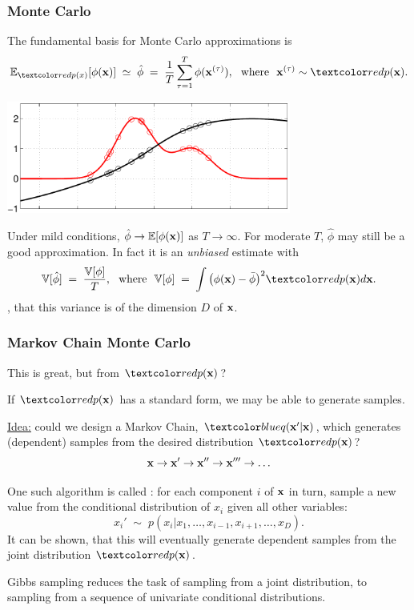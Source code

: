 \begin{frame}
\frametitle{Monte Carlo}

The fundamental basis for Monte Carlo approximations is
\[
\E_{\Red{p(x)}}[\phi(\bfx)]\;\simeq\;\hat\phi\;=\;\frac{1}{T}\sum_{\tau=1}^T\phi(\bfx^{(\tau)}),
\text{\ \ where\ \ }\bfx^{(\tau)}\sim \Red{p(\bfx)}.
\]

\centerline{\includegraphics[width=0.7\textwidth]{mc4}}

Under mild conditions, $\hat\phi\rightarrow\mathbb{E}[\phi(\mathbf x)]$ as
$T\rightarrow\infty$. For moderate $T$, $\hat\phi$ may still be a good
approximation. In fact it is an \emph{unbiased} estimate with
\[
\V[\hat\phi]\;=\;\frac{\V[\phi]}{T}, \text{\ \ where\ \ }
\V[\phi]\;=\;\int \big(\phi(\bfx)-\bar\phi\big)^2\Red{p(\bfx)}d\bfx.
\]
, that this variance is  of the dimension
$D$ of $\mathbf x$.
\end{frame}


\begin{frame}
\frametitle{Markov Chain Monte Carlo}

This is great, but  from
$\Red{p(\bfx)}$?

If $\Red{p(\bfx)}$ has a standard form, we may be
able to generate  samples.

\underline{Idea:} could we design a Markov Chain,
$\Blue{q(\bfx'|\bfx)}$, which generates (dependent) samples from the
desired distribution $\Red{p(\bfx)}$?
\[
\mathbf x \rightarrow \mathbf x' \rightarrow \mathbf x'' \rightarrow  \mathbf x'''
\rightarrow \ldots
\]


One such algorithm is called : for each
component $i$ of $\mathbf x$ in turn, sample a new value from the
conditional distribution of $x_i$ given all other variables:
\[
x_i'\;\sim\;p(x_i|x_1,\ldots,x_{i-1},x_{i+1},\ldots,x_D).
\]
It can be shown, that this will eventually generate dependent samples from the 
joint distribution $\Red{p(\bfx)}$.

Gibbs sampling reduces the task of sampling from a joint distribution,
to sampling from a sequence of univariate conditional distributions.
\end{frame}



